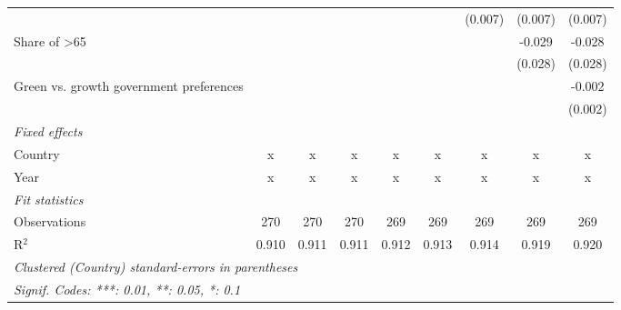 \begin{table}[htbp]
\begin{tabular}{lcccccccc}
                                                     &         &         &         &         &         & (0.007) & (0.007) & (0.007)\\   
      Share of >65                                   &         &         &         &         &         &         & -0.029  & -0.028\\   
                                                     &         &         &         &         &         &         & (0.028) & (0.028)\\   
      Green vs. growth government preferences        &         &         &         &         &         &         &         & -0.002\\   
                                                     &         &         &         &         &         &         &         & (0.002)\\   
      \emph{Fixed effects}\\
      Country                                        & x       & x       & x       & x       & x       & x       & x       & x\\  
      Year                                           & x       & x       & x       & x       & x       & x       & x       & x\\  
      \midrule \emph{Fit statistics}\\
      Observations                                   & 270     & 270     & 270     & 269     & 269     & 269     & 269     & 269\\  
      R$^2$                                          & 0.910   & 0.911   & 0.911   & 0.912   & 0.913   & 0.914   & 0.919   & 0.920\\  
      \midrule
      \multicolumn{9}{l}{\emph{Clustered (Country) standard-errors in parentheses}}\\
      \multicolumn{9}{l}{\emph{Signif. Codes: ***: 0.01, **: 0.05, *: 0.1}}\\
   \end{tabular}
\end{table}


